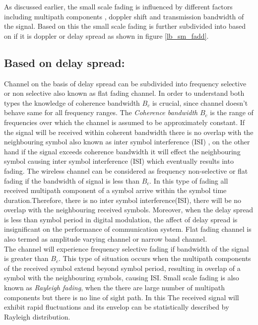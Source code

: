 As discussed earlier, the small scale fading is influenced by different factors including multipath components , doppler shift and transmission bandwidth of the signal.  Based on this the small scale fading is further subdivided into based on if it is doppler or delay spread as shown in figure \ref{lb_sm_fadd}.
\subsection{Based on delay spread: }
Channel on the basis of delay spread can be subdivided into frequency selective or non selective also known as flat fading channel. In order to understand both types the knowledge of coherence bandwidth $B_c$ is crucial, since channel doesn’t behave same for all frequency ranges. The 
\textit{Coherence bandwidth} $B_c$ is the range of frequencies over which the channel is assumed to be approximately constant. 
If the signal will be received within coherent bandwidth there is no overlap with the neighbouring symbol also known as inter symbol interference (ISI) , on the other hand if the signal exceeds coherence bandwidth it will effect the neighbouring symbol causing inter symbol interference (ISI) which eventually results into fading. 
The wireless channel can be considered as frequency non-selective or flat fading if the bandwidth of signal is less than $B_c$. In this type of fading all received multipath component of a symbol arrive within the symbol time duration\cite{fading_sprger}.Therefore, there is no inter symbol interference(ISI), there will be no overlap with the neighbouring received symbols. Moreover, when the delay spread is less than symbol period in digital modulation, the affect of delay spread is insignificant on the performance of communication system. Flat fading channel is also termed as amplitude varying channel or narrow band channel.\\
The channel will experience frequency  selective fading if bandwidth of the signal is greater than $B_c$. This type of situation occurs when the multipath components of the received symbol extend beyond symbol period, resulting in overlap of a symbol with the neighbouring symbols, causing ISI.
Small scale fading is also known as \textit{Rayleigh fading}, when the there are large number of multipath components but there is no line of sight path. In this The received signal will exhibit rapid fluctuations and its envelop can be statistically described by Rayleigh distribution.\\
